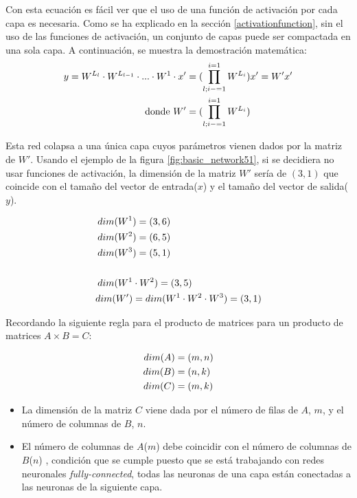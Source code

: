 Con esta ecuación es fácil ver que el uso de una función de activación por cada capa es necesaria. Como se ha explicado en la sección \ref{activationfunction}, sin el uso de las funciones de activación, un conjunto de capas puede ser compactada en una sola capa. A continuación, se muestra la demostración matemática:
\begin{equation}
\centering
    \begin{split}
    y = W^{L_l} \cdot W^{L_{l-1}} \cdot ... \cdot W^{1} \cdot x' &= (\prod_{l;i-=1}^{i=1} W^{L_i})x' = W'x'\\
    \text{donde}~W' &= (\prod_{l;i-=1}^{i=1} W^{L_i})
  \end{split}
    \label{eqn:feedforwardnoactivation}
\end{equation}

Esta red colapsa a una única capa cuyos parámetros vienen dados por la matriz de $W'$. Usando el ejemplo de la figura \ref{fig:basic_network51}, si se decidiera no usar funciones de activación, la dimensión de la matriz $W'$ sería de $(3,1)$ que coincide con el tamaño del vector de entrada($x$) y el tamaño del vector de salida($y$).

\begin{equation}
\centering
    \begin{split}
    dim(W^1&) = (3,6) \\
    dim(W^2&) = (6,5) \\
    dim(W^3&) = (5,1) \\ \\
    dim(W^1 &\cdot W^2) = (3,5)\\
    dim(W') &= dim(W^1 \cdot W^2 \cdot W^3) = (3,1)
    \end{split}
\end{equation}

Recordando la siguiente regla para el producto de matrices para un producto de matrices $A \times B = C$:

\begin{equation}
\centering
    \begin{split}
    dim(A) &= (m, n) \\
    dim(B) &= (n, k) \\
    dim(C) &= (m, k)
    \end{split}
    \label{eqn:dimensions}
\end{equation}

\begin{itemize}
    \item La dimensión de la matriz $C$ viene dada por el número de filas de $A$, $m$, y el número de columnas de $B$, $n$.
    \item El número de columnas de $A$($m$) debe coincidir con el número de columnas de $B$($n$)
    , condición que se cumple puesto que se está trabajando con redes neuronales \textit{fully-connected}, todas las neuronas de una capa están conectadas a las neuronas de la siguiente capa.
\end{itemize}

